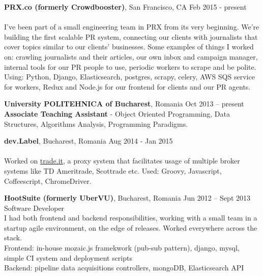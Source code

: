 \documentclass[margin,line]{resume}
\begin{document}
\begin{resume}
    \vspace{1.2mm}\textbf{PRX.co (formerly Crowdbooster)}, San Francisco, CA
        \hfill Feb 2015 - present\vspace{1mm}\\
    \selectfont{Software Developer}\vspace{1.2mm}\\
    {\fontsize{2.65mm}{1em}\selectfont
    I've been part of a small engineering team in PRX from its very beginning. We're building the first scalable PR system, connecting our clients with journalists that cover topics similar to our clients' businesses. Some examples of things I worked on: crawling journalists and their articles, our own inbox and campaign manager, internal tools for our PR people to use, periodic workers to scrape and be polite.\vspace{1.2mm}\\
    Using: Python, Django, Elasticsearch, postgres, scrapy, celery, AWS SQS service for workers, Redux and Node.js for our frontend for clients and our PR agents.
    }

    \vspace{1.2mm}\textbf{University POLITEHNICA of Bucharest}, Romania
        \hfill Oct 2013 -- present\vspace{1mm}\\
        \textbf{Associate Teaching Assistant} - {\fontsize{2.65mm}{1em}\selectfont Object Oriented Programming, Data Structures, Algorithms Analysis, Programming Paradigms.}

    \vspace{1.2mm}\textbf{dev.Label}, Bucharest, Romania
        \hfill Aug 2014 - Jan 2015\vspace{1mm}\\
    \selectfont{Frontend \& Backend Developer}\vspace{1.2mm}\\
    {\fontsize{2.65mm}{1em}\selectfont
      Worked on \href{https://www.trade.it/}{trade.it}, a proxy system that facilitates usage of multiple broker systems like TD Ameritrade, Scottrade etc. Used: Groovy, Javascript, Coffeescript, ChromeDriver.
     }

    \vspace{1.2mm}\textbf{HootSuite (formerly UberVU)}, Bucharest, Romania
        \hfill Jun 2012 -- Sept 2013\vspace{1mm}\\
        Software Developer\vspace{1.2mm}\\
    {\fontsize{2.65mm}{1em}\selectfont
      I had both frontend and backend responsibilities, working with a small team in a startup agile environment, on the edge of releases. Worked everywhere across the stack.\vspace{1.2mm}\\
      Frontend: in-house mozaic.js framekwork (pub-sub pattern), django, mysql, simple CI system and deployment scripts\vspace{1.2mm}\\
      Backend: pipeline data acquisitions controllers, mongoDB, Elasticsearch API
    }


\end{resume}
\end{document}
